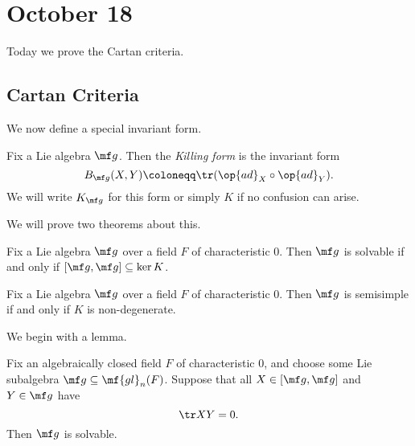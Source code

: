 \documentclass[../notes.tex]{subfiles}
\begin{document}
\section{October 18}
Today we prove the Cartan criteria.

\subsection{Cartan Criteria}
We now define a special invariant form.
\begin{definition}
	Fix a Lie algebra $\mf g$. Then the \textit{Killing form} is the invariant form
	\[B_{\mf g}(X,Y)\coloneqq\tr({\op{ad}_X}\circ{\op{ad}_Y}).\]
	We will write $K_{\mf g}$ for this form or simply $K$ if no confusion can arise.
\end{definition}
We will prove two theorems about this.
\begin{theorem} \label{thm:cartan-solvable}
	Fix a Lie algebra $\mf g$ over a field $F$ of characteristic $0$. Then $\mf g$ is solvable if and only if $[\mf g,\mf g]\subseteq\ker K$.
\end{theorem}
\begin{theorem} \label{thm:cartain-semisimple}
	Fix a Lie algebra $\mf g$ over a field $F$ of characteristic $0$. Then $\mf g$ is semisimple if and only if $K$ is non-degenerate.
\end{theorem}
We begin with a lemma.
\begin{lemma} \label{lem:get-cartan-solvability}
	Fix an algebraically closed field $F$ of characteristic $0$, and choose some Lie subalgebra $\mf g\subseteq\mf{gl}_n(F)$. Suppose that all $X\in[\mf g,\mf g]$ and $Y\in\mf g$ have
	\[\tr XY=0.\]
	Then $\mf g$ is solvable.
\end{lemma}
\end{document}
